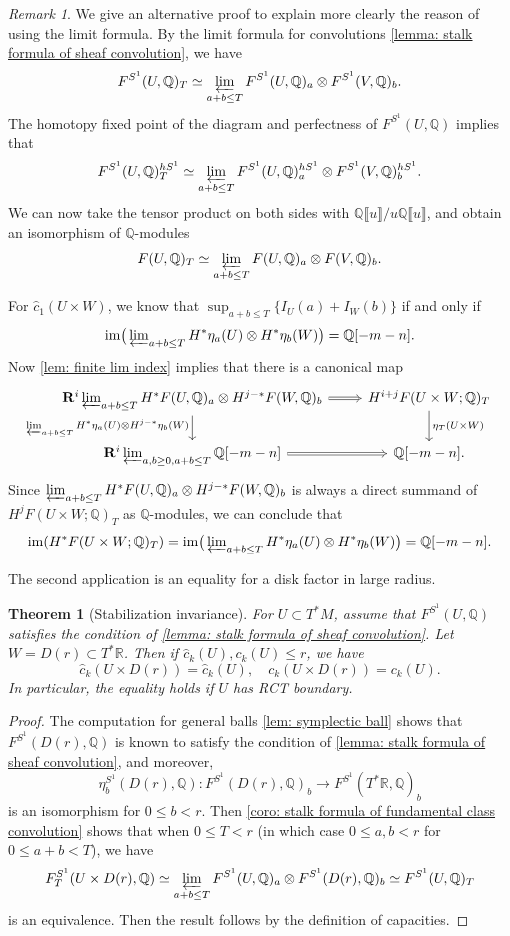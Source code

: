 \documentclass[11pt]{amsart}
\numberwithin{equation}{section}
\theoremstyle{plain}
\newtheorem{Thm}{Theorem}[section]
\theoremstyle{definition}
\theoremstyle{remark}
\newtheorem{RMK}[rmk]{Remark}
\newcommand{\bQ} { {\mathbb{Q}}}
\newcommand{\bR} { {\mathbb{R}}}
\newcommand{\fpw}[1]{{\llbracket #1\rrbracket}}
\newcommand\im{ {\operatorname{im}} }
\begin{document}
\begin{RMK}
We give an alternative proof to explain more clearly the reason of using the limit formula. By the limit formula for convolutions \autoref{lemma: stalk formula of sheaf convolution}, we have
\[F^{S^1}(U, \bQ)_T \simeq \varprojlim_{a+b\leq T}F^{S^1}(U,\bQ)_a \otimes F^{S^1}(V, \bQ)_b.\]
The homotopy fixed point of the diagram and perfectness of $F^{S^1}(U,\bQ)$ implies that
\[F^{S^1}(U, \bQ)_T^{hS^1} \simeq \varprojlim_{a+b\leq T}F^{S^1}(U,\bQ)_a^{hS^1} \otimes F^{S^1}(V, \bQ)_b^{hS^1}.\]
We can now take the tensor product on both sides with $\bQ\fpw{u}/u\bQ\fpw{u}$, and obtain an isomorphism of $\bQ$-modules
\[F(U, \bQ)_T \simeq \varprojlim_{a+b\leq T}F(U,\bQ)_a \otimes F(V, \bQ)_b.\]

For $\widehat c_1(U\times W)$, we know that $\sup_{a+b\leq T}\{I_U(a) + I_W(b)\}$ if and only if 
\[\im\big(\varprojlim\nolimits_{a+b\leq T} H^*\eta_a(U) \otimes H^*\eta_b(W)\big) = \bQ[-m-n].\]
Now \autoref{lem: finite lim index} implies that there is a canonical map
\[\begin{tikzcd}
\mathbf{R}^i\varprojlim\nolimits_{a+b\leq T}H^*F(U,\bQ)_a \otimes H^{j-*}F(W,\bQ)_b \ar[r, Rightarrow] \ar[d,"\varprojlim\nolimits_{a+b\leq T} H^*\eta_a(U) \otimes H^{j-*}\eta_b(W)" left] & H^{i+j}F(U \times W; \bQ)_T \ar[d,"\eta_{T}(U\times W)"] \\
\mathbf{R}^i\varprojlim\nolimits_{a,b\geq 0,a+b\leq T}\bQ[-m-n] \ar[r, Rightarrow] & \bQ[-m-n].
\end{tikzcd}\]
Since $\varprojlim\nolimits_{a+b\leq T}H^*F(U,\bQ)_a \otimes H^{j-*}F(W,\bQ)_b$ is always a direct summand of $H^jF(U \times W; \bQ)_T$ as $\bQ$-modules, we can conclude that
\[\im(H^*F(U \times W; \bQ)_T) = \im\big(\varprojlim\nolimits_{a+b\leq T} H^*\eta_a(U) \otimes H^*\eta_b(W)\big) = \bQ[-m-n].\]
\end{RMK}

The second application is an equality for a disk factor in large radius.
\begin{Thm}[Stabilization invariance]\label{coro: disk stablization}For $U \subset T^*M$, assume that $F^{S^1}(U,\bQ)$  satisfies the condition of \autoref{lemma: stalk formula of sheaf convolution}. Let $W=D(r)\subset T^*\bR$. Then if $\widehat{c}_k(U),c_k(U)\leq r$, we have
\[\widehat{c}_k(U\times D(r))=\widehat{c}_k(U), \quad c_k(U\times D(r))=c_k(U).\]
In particular, the equality holds if $U$ has RCT boundary.
\end{Thm}
\begin{proof}
The computation for general balls \autoref{lem: symplectic ball} shows that $F^{S^1}(D(r),\bQ)$ is known to satisfy the condition of \autoref{lemma: stalk formula of sheaf convolution}, and moreover,
\[\eta_b^{S^1}(D(r),\bQ): F^{S^1}(D(r),\bQ)_b\to F^{S^1}(T^*\bR,\bQ)_b\]
is an isomorphism for $0\leq b< r$. Then \autoref{coro:  stalk formula of fundamental class convolution} shows that when $0\leq T< r$ (in which case $0 \leq a,b < r$ for $0\leq a+b< T$), we have
\[F_T^{S^1}(U\times D(r),\bQ) \simeq \varprojlim_{a+b\leq T} F^{S^1}(U,\bQ)_a\otimes F^{S^1}(D(r),\bQ)_b \simeq F^{S^1}(U,\bQ)_T\]
is an equivalence. Then the result follows by the definition of capacities.    
\end{proof}
\end{document}
